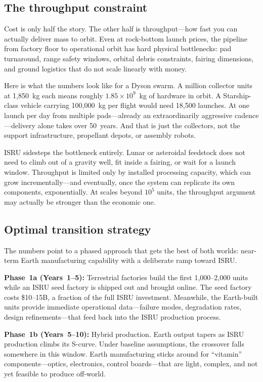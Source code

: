 \documentclass[preprint,12pt]{elsarticle}
\begin{document}
\subsection{The throughput constraint}

Cost is only half the story. The other half is throughput---how fast you can actually deliver mass to orbit. Even at rock-bottom launch prices, the pipeline from factory floor to operational orbit has hard physical bottlenecks: pad turnaround, range safety windows, orbital debris constraints, fairing dimensions, and ground logistics that do not scale linearly with money.

Here is what the numbers look like for a Dyson swarm. A million collector units at 1{,}850~kg each means roughly $1.85 \times 10^9$~kg of hardware in orbit. A Starship-class vehicle carrying 100{,}000~kg per flight would need 18{,}500 launches. At one launch per day from multiple pads---already an extraordinarily aggressive cadence---delivery alone takes over 50~years. And that is just the collectors, not the support infrastructure, propellant depots, or assembly robots.

ISRU sidesteps the bottleneck entirely. Lunar or asteroidal feedstock does not need to climb out of a gravity well, fit inside a fairing, or wait for a launch window. Throughput is limited only by installed processing capacity, which can grow incrementally---and eventually, once the system can replicate its own components, exponentially. At scales beyond $10^5$ units, the throughput argument may actually be stronger than the economic one.

\subsection{Optimal transition strategy}

The numbers point to a phased approach that gets the best of both worlds: near-term Earth manufacturing capability with a deliberate ramp toward ISRU.

\textbf{Phase~1a (Years~1--5):} Terrestrial factories build the first 1{,}000--2{,}000 units while an ISRU seed factory is shipped out and brought online. The seed factory costs \$10--15B, a fraction of the full ISRU investment. Meanwhile, the Earth-built units provide immediate operational data---failure modes, degradation rates, design refinements---that feed back into the ISRU production process.

\textbf{Phase~1b (Years~5--10):} Hybrid production. Earth output tapers as ISRU production climbs its S-curve. Under baseline assumptions, the crossover falls somewhere in this window. Earth manufacturing sticks around for ``vitamin'' components---optics, electronics, control boards---that are light, complex, and not yet feasible to produce off-world.
\end{document}
